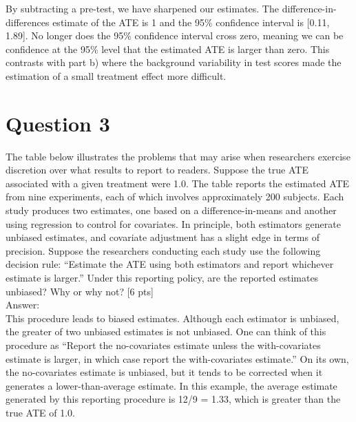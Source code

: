 \documentclass[11pt,notitlepage]{article}\usepackage[]{graphicx}\usepackage[]{color}
\begin{document}
\begin{enumerate}[a)]
By subtracting a pre-test, we have sharpened our estimates.  The difference-in-differences estimate of the ATE is 1 and the 95\% confidence interval is [0.11, 1.89].  No longer does the 95\% confidence interval cross zero, meaning we can be confidence at the 95\% level that the estimated ATE is larger than zero. This contrasts with part b) where the background variability in test scores made the estimation of a small treatment effect more difficult.

\end{enumerate}

\section*{Question 3}
The table below illustrates the problems that may arise when researchers exercise discretion over what results to report to readers. Suppose the true ATE associated with a given treatment were 1.0. The table reports the estimated ATE from nine experiments, each of which involves approximately 200 subjects. Each study produces two estimates, one based on a difference-in-means and another using regression to control for covariates. In principle, both estimators generate unbiased estimates, and covariate adjustment has a slight edge in terms of precision. Suppose the researchers conducting each study use the following decision rule: ``Estimate the ATE using both estimators and report whichever estimate is larger.'' Under this reporting policy, are the reported estimates unbiased? Why or why not? [6 pts]\\
Answer:\\
This procedure leads to biased estimates. Although each estimator is unbiased, the greater of two unbiased estimates is not unbiased. One can think of this procedure as ``Report the no-covariates estimate unless the with-covariates estimate is larger, in which case report the with-covariates estimate.'' On its own, the no-covariates estimate is unbiased, but it tends to be corrected when it generates a lower-than-average estimate. In this example, the average estimate generated by this reporting procedure is 12/9 = 1.33, which is greater than the true ATE of 1.0.
\end{document}
